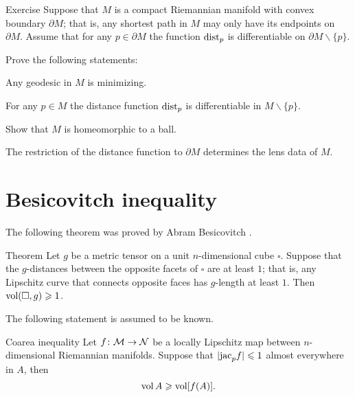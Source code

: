 \begin{thm}{Exercise}\label{ex:simple-mnfld}
Suppose that $M$ is a compact Riemannian manifold with convex boundary $\partial M$;
that is, any shortest path in $M$ may only have its endpoints on $\partial M$.
Assume that for any $p\in \partial M$ the function $\mathrm{dist}_p$ is differentiable on $\partial M\backslash\{p\}$.

Prove the following statements:

\begin{subthm}{}
Any geodesic in $M$ is minimizing.
\end{subthm}

\begin{subthm}{}
For any $p\in M$ the distance function $\mathrm{dist}_p$ is differentiable in $M\backslash\{p\}$.
\end{subthm}

\begin{subthm}{}
Show that $M$ is homeomorphic to a ball.
\end{subthm}

\begin{subthm}{}
The restriction of the distance function to $\partial M$ determines the lens data of $M$.
\end{subthm}


\end{thm}





\section{Besicovitch inequality}

The following theorem was proved by Abram Besicovitch \cite{besicovitch}.

\begin{thm}{Theorem}\label{thm:besikovitch}
Let $g$ be a metric tensor on a unit $n$-dimensional cube $\square$.
Suppose that the $g$-distances between the opposite facets of $\square$ are at least $1$; that is, any Lipschitz curve that connects opposite faces has $g$-length at least $1$.
Then $\operatorname{\rm vol}\nolimits(\square, g)\geqslant 1$.
\end{thm}

The following statement is assumed to be known.

\begin{thm}{Coarea inequality}\label{cor:area-inequality}
Let $f\colon\mathcal{M}\to\mathcal{N}$ be a locally Lipschitz map between $n$-dimensional Riemannian manifolds.
Suppose that $|\jac_p f|\z\le 1$ almost everywhere in $A$, then 
\[\operatorname{\rm vol}\nolimits A \geqslant \operatorname{\rm vol}\nolimits[f(A)].\]
\end{thm}

